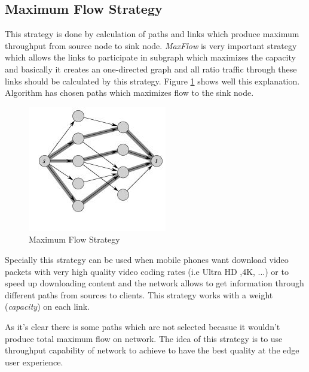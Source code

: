 \subsection{Maximum Flow Strategy}
This strategy is done by calculation of paths and links which produce maximum throughput from source node to sink node. \textit{MaxFlow} is very important strategy which allows the links to participate in subgraph which maximizes the capacity and basically it creates an one-directed graph and all ratio traffic through these links should be calculated by this strategy. Figure \ref{max} shows well this explanation. Algorithm has chosen paths which maximizes flow to the sink node.

\begin{figure}[H]

\begin{center}

\includegraphics[scale = 0.8]{Pictures/max.jpg}

\caption{Maximum Flow Strategy} \label{max} 

\end{center}

\end{figure}


 
Specially this strategy can be used when mobile phones want download video packets with very high quality video coding rates (i.e Ultra HD ,4K, ...) or to speed up downloading content and the network allows to get information through different paths from sources to clients. This strategy works with a weight (\textit{capacity}) on each link.

As it's clear there is some paths which are not selected becasue it wouldn't produce total maximum flow on network.  The idea of this strategy is to use throughput capability of network to achieve to have the best quality at the edge user experience. 







